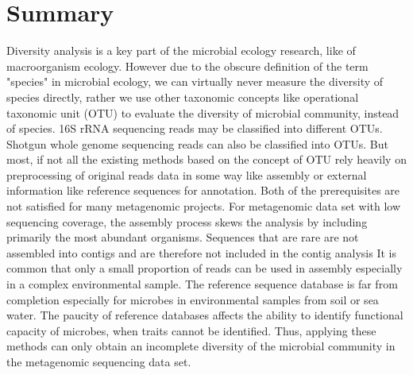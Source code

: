   

\section{Summary}

Diversity analysis is a key part of the microbial ecology research, like of
macroorganism ecology. However due to the obscure definition of the term
"species" in microbial ecology, we can virtually never measure the diversity of
species directly, rather we use other taxonomic concepts like operational
taxonomic unit (OTU) to evaluate the diversity of microbial community, instead
of species. 16S rRNA sequencing reads may be classified into different OTUs.
Shotgun whole genome sequencing reads can also be classified into OTUs. But
most, if not all the existing methods based on the concept of OTU rely heavily on  
preprocessing of original reads data in some way like assembly or external 
information like reference sequences for annotation. Both of the prerequisites
are not satisfied for many metagenomic projects. For metagenomic data set with
low sequencing coverage, the assembly process skews the analysis by including 
primarily the most abundant organisms. Sequences that are rare are not 
assembled into contigs and are therefore not included in the contig analysis
It is common that only a small proportion of
reads can be used in assembly especially in a complex environmental sample. 
\cite{Howe2012} The reference sequence database is far from
completion especially for microbes in environmental samples from soil or sea water.
The paucity of reference databases affects the ability to identify functional 
capacity of microbes, when traits cannot be identified. 
Thus, applying these methods can only obtain an incomplete diversity of
the microbial community in the metagenomic sequencing data set. 

